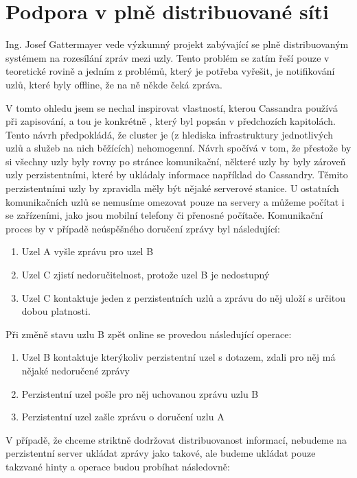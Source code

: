 \section{Podpora v plně distribuované síti}
Ing. Josef Gattermayer vede výzkumný projekt zabývající se plně distribuovaným systémem na rozesílání zpráv mezi uzly. Tento problém se zatím řeší pouze v teoretické rovině a jedním z problémů, který je potřeba vyřešit, je notifikování uzlů, které byly offline, že na ně někde čeká zpráva. 

V tomto ohledu jsem se nechal inspirovat vlastností, kterou Cassandra používá při zapisování, a tou je konkrétně , který byl popsán v předchozích kapitolách. Tento návrh předpokládá, že cluster je (z hlediska infrastruktury jednotlivých uzlů a služeb na nich běžících) nehomogenní. Návrh spočívá v tom, že přestože by si všechny uzly byly rovny po stránce komunikační, některé uzly by byly zároveň uzly perzistentními, které by ukládaly informace například do Cassandry. Těmito perzistentními uzly by zpravidla měly být nějaké serverové stanice. U ostatních komunikačních uzlů se nemusíme omezovat pouze na servery a můžeme počítat i se zařízeními, jako jsou mobilní telefony či přenosné počítače. Komunikační proces by v případě neúspěšného doručení zprávy byl následující: 

\begin{enumerate}
\item Uzel A vyšle zprávu pro uzel B
\item Uzel C zjistí nedoručitelnost, protože uzel B je nedostupný
\item Uzel C kontaktuje jeden z perzistentních uzlů a zprávu do něj uloží s určitou dobou platnosti. 
\end{enumerate}

Při změně stavu uzlu B zpět online se provedou následující operace:

\begin{enumerate}
\item Uzel B kontaktuje kterýkoliv perzistentní uzel s dotazem, zdali pro něj má nějaké nedoručené zprávy
\item Perzistentní uzel pošle pro něj uchovanou zprávu uzlu B
\item Perzistentní uzel zašle zprávu o doručení uzlu A
\end{enumerate}


V případě, že chceme striktně dodržovat distribuovanost informací, nebudeme na perzistentní server ukládat zprávy jako takové, ale budeme ukládat pouze takzvané hinty a operace budou probíhat následovně: 

